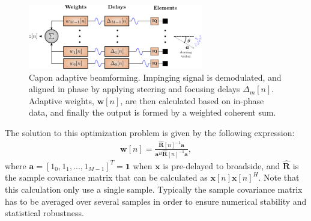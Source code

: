 \documentclass[journal]{IEEEtran}
\newcommand{\mat}[1]{\mathbf{#1}}
\renewcommand{\vec}[1]{\mathbf{#1}}
\begin{document}

\begin{figure}
\centerline{\includegraphics[width=3in]{gfx/beamforming_mv_lowres.png}}
\caption{Capon adaptive beamforming. Impinging signal is demodulated, and aligned in phase by applying steering and focusing delays $\Delta_m[n]$. Adaptive weights, $\vec{w}[n]$, are then calculated based on in-phase data, and finally the output is formed by a weighted coherent sum.}
\label{fig:mvbf}
\end{figure}

The solution to this optimization problem is given by the following expression:
\begin{align}\label{eq:w}
\vec{w}[n] = \frac{\mat{\hat{R}}[n]^{-1}\vec{a}}{\vec{a}^H\mat{\hat{R}}[n]^{-1}\vec{a}},
\end{align}
where $\vec{a} = [1_0, 1_1, ..., 1_{M-1}]^T = \vec{1}$ when $\vec{x}$ is pre-delayed to broadside, and $\mat{\hat{R}}$ is the sample covariance matrix that can be calculated as $\vec{x}[n]\vec{x}[n]^H$. 
Note that this calculation only use a single sample. Typically the sample covariance matrix has to be averaged over several samples in order to ensure numerical stability and statistical robustness. 
\end{document}
